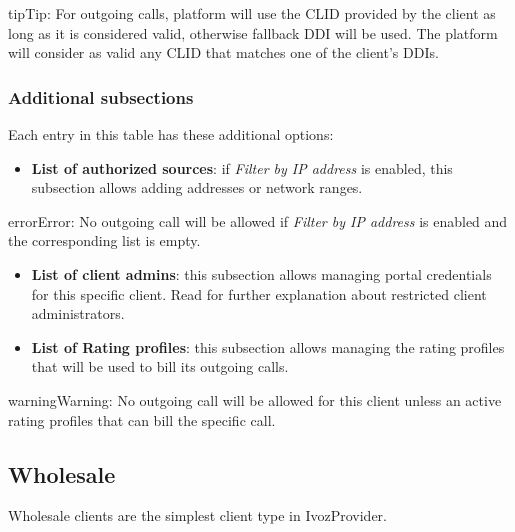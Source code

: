 \documentclass[letterpaper,10pt,english]{sphinxmanual}
\begin{document}
\begin{notice}{tip}{Tip:}
For outgoing calls, platform will use the CLID provided by the client as long as it is considered valid, otherwise fallback DDI
will be used. The platform will consider as valid any CLID that matches one of the client's DDIs.
\end{notice}


\subsubsection{Additional subsections}
\label{administration_portal/brand/clients/retail:additional-subsections}
Each entry in this table has these additional options:
\begin{itemize}
\item {} 
\textbf{List of authorized sources}: if \emph{Filter by IP address} is enabled, this subsection allows adding addresses or network ranges.

\end{itemize}

\begin{notice}{error}{Error:}
No outgoing call will be allowed if \emph{Filter by IP address} is enabled and the corresponding list is empty.
\end{notice}
\begin{itemize}
\item {} 
\textbf{List of client admins}: this subsection allows managing portal credentials for this specific client. Read {\hyperref[api_rest/acls:acls]{}}
for further explanation about restricted client administrators.

\item {} 
\textbf{List of Rating profiles}: this subsection allows managing the rating profiles that will be used to bill its outgoing calls.

\end{itemize}

\begin{notice}{warning}{Warning:}
No outgoing call will be allowed for this client unless an active rating profiles that can
bill the specific call.
\end{notice}


\subsection{Wholesale}
\label{administration_portal/brand/clients/wholesale:wholesale}\label{administration_portal/brand/clients/wholesale:wholesale-clients}\label{administration_portal/brand/clients/wholesale::doc}
Wholesale clients are the simplest client type in IvozProvider.
\end{document}

